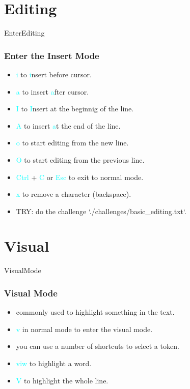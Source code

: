 \documentclass{beamer}
\newcommand{\highlight}[1]{\textcolor{cyan}{\textsf{#1}}}
\begin{document}
\section{Editing}
\begin{frame}{EnterEditing}
    \frametitle{Enter the Insert Mode}
    \begin{itemize}
        \item \highlight{i} to \highlight{i}nsert before cursor.
        \item \highlight{a} to insert \highlight{a}fter cursor.
        \item \highlight{I} to \highlight{I}nsert at the beginnig of the line.
        \item \highlight{A} to insert \highlight{a}t the end of the line.
        \item \highlight{o} to start editing from the new line.
        \item \highlight{O} to start editing from the previous line.
        \item \highlight{Ctrl} + \highlight{C} or \highlight{Esc} to exit to normal mode.
        \item \highlight{x} to remove a character (backspace).
        \item TRY: do the challenge `./challenges/basic\_editing.txt`.
    \end{itemize}
\end{frame}

\section{Visual}
\begin{frame}{VisualMode}
    \frametitle{Visual Mode}
    \begin{itemize}
        \item commonly used to highlight something in the text.
        \item \highlight{v} in normal mode to enter the visual mode.
        \item you can use a number of shortcuts to select a token.
        \item \highlight{viw} to highlight a word.
        \item \highlight{V} to highlight the whole line.
    \end{itemize}
\end{frame}
\end{document}
